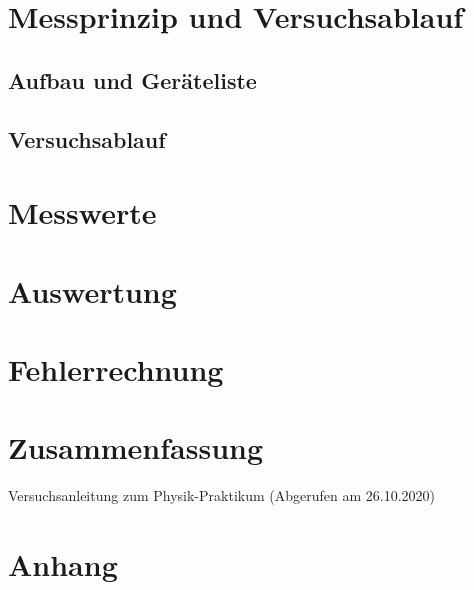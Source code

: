 \documentclass[a4paper,12pt,bibtotocnumbered]{scrartcl}
\numberwithin{equation}{section} %
\begin{document}
\section[Messprinzip]{Messprinzip und Versuchsablauf}

\subsection{Aufbau und Geräteliste}

\subsection{Versuchsablauf}

\section[Messwerte]{Messwerte}
\section[Auswertung]{Auswertung}
\section[Fehlerrechnung]{Fehlerrechnung}
\section[Zusammenfassung]{Zusammenfassung}
\begin{thebibliography}{999}
 Versuchsanleitung zum Physik-Praktikum (Abgerufen am 26.10.2020) 
\end{thebibliography}


\section{Anhang}

\end{document}

